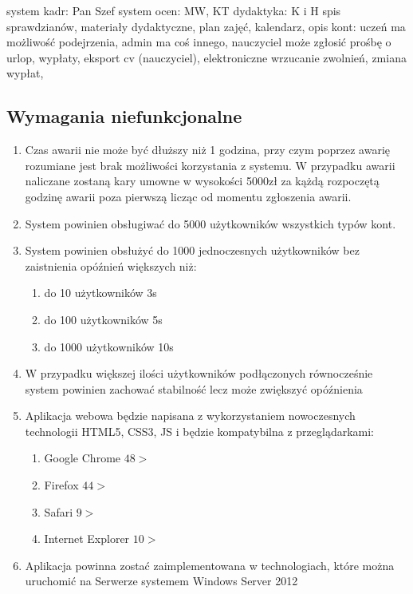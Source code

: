 \documentclass{article}
\begin{document}
system kadr: Pan Szef
system ocen: MW, KT
dydaktyka: K i H spis sprawdzianów, materiały dydaktyczne, plan zajęć, kalendarz, opis kont: uczeń ma możliwość podejrzenia, admin ma coś innego, nauczyciel może zgłosić prośbę o urlop, wypłaty, eksport cv (nauczyciel), elektroniczne wrzucanie zwolnień, zmiana wypłat,


\subsection{Wymagania niefunkcjonalne}
\begin{enumerate}
	\item Czas awarii nie może być dłuższy niż 1 godzina, przy czym poprzez awarię rozumiane jest brak możliwości korzystania z systemu. W przypadku awarii naliczane zostaną kary umowne w wysokości 5000zł za kążdą rozpoczętą godzinę awarii poza pierwszą licząc od momentu zgłoszenia awarii.
	\item System powinien obsługiwać do 5000 użytkowników wszystkich typów kont.
	\item System powinien obsłużyć do 1000 jednoczesnych użytkowników bez zaistnienia opóźnień większych niż:
	\begin{enumerate}
		\item 	do 10 użytkowników 3s
		\item do 100 użytkowników 5s
		\item do 1000 użytkowników 10s
	\end{enumerate}
	\item W przypadku większej ilości użytkowników podłączonych równocześnie system powinien zachować stabilność lecz może zwiększyć opóźnienia
	\item Aplikacja webowa będzie napisana z wykorzystaniem nowoczesnych technologii HTML5, CSS3, JS i będzie kompatybilna z przeglądarkami:
	\begin{enumerate}
		\item Google Chrome $48>$
		\item Firefox $44>$
		\item Safari $9>$
		\item Internet Explorer $10>$
	\end{enumerate}
	\item Aplikacja powinna zostać zaimplementowana w technologiach, które można uruchomić na Serwerze systemem Windows Server 2012

\end{enumerate}
\end{document}
